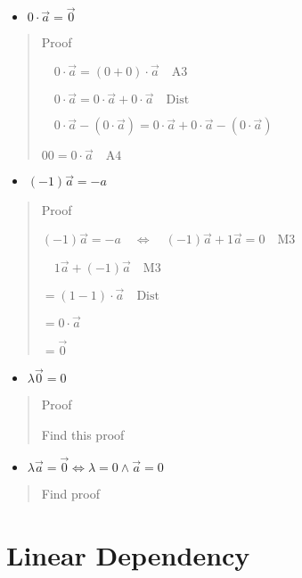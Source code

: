 \documentclass{tufte-handout}
\providecommand{\tightlist}{%
  \setlength{\itemsep}{0pt}\setlength{\parskip}{0pt}}
\begin{document}
\begin{itemize}
\tightlist
\item
  \(0 \cdot \vec{a} = \vec{0}\)
\end{itemize}

\begin{quote}
Proof

\(\quad 0 \cdot \vec{a} = (0 + 0) \cdot \vec{a} \quad \text{A3}\)

\(\quad 0 \cdot \vec{a} = 0 \cdot \vec{a} + 0 \cdot \vec{a} \quad \text{Dist}\)

\(\quad 0 \cdot \vec{a} - (0 \cdot \vec{a}) = 0 \cdot \vec{a} + 0 \cdot \vec{a} - ( 0 \cdot \vec{a})\)

\(0 0 = 0 \cdot \vec{a} \quad \text{A4}\)
\end{quote}

\begin{itemize}
\tightlist
\item
  \((-1) \vec{a} = -a\)
\end{itemize}

\begin{quote}
Proof

\((-1) \vec{a} = -a \quad \Leftrightarrow \quad (-1) \vec{a} +1 \vec{a} = 0 \quad \text{M3}\)

\(\quad 1 \vec{a} + (-1) \vec{a} \quad \text{M3}\)

\(=(1 - 1) \cdot \vec{a} \quad \text{Dist}\)

\(=0 \cdot \vec{a}\)

\(=\vec{0}\)
\end{quote}

\begin{itemize}
\tightlist
\item
  \(\lambda \vec{0} = 0\)
\end{itemize}

\begin{quote}
Proof

Find this proof
\end{quote}

\begin{itemize}
\tightlist
\item
  \(\lambda \vec{a} = \vec{0} \Leftrightarrow \lambda = 0 \wedge \vec{a}=0\)
\end{itemize}

\begin{quote}
Find proof
\end{quote}\hypertarget{linear-dependency}{%
\section{Linear Dependency}\label{linear-dependency}}
\end{document}
